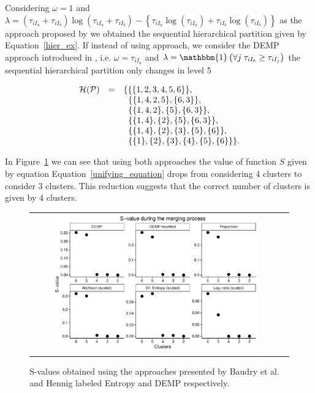 \documentclass[10pt, a4paper]{article}
\begin{document}
\begin{spacing}{1.9}
Considering $\omega = 1$ and $\lambda = (\tau_{iI_a}+\tau_{iI_b}) \log(\tau_{iI_a} + \tau_{iI_b}) - \left\{ \tau_{iI_a} \log(\tau_{iI_a}) + \tau_{iI_b} \log(\tau_{iI_b}) \right\}$ as the approach proposed by \cite{baudry2010combining} we obtained the sequential hierarchical partition given by Equation~\ref{hier_ex}. If instead of using \cite{baudry2010combining}  approach, we consider  the DEMP approach introduced in \citep{hennig2010methods}, i.e. $\omega = \tau_{i I_a}$ and $\lambda = \mathbbm{1}\left( \forall j\; \tau_{i I_{b}} \geq \tau_{iI_j} \right)$ the sequential hierarchical partition only changes in level 5

\begin{equation}
\begin{array}{r c l}
\mathcal{H}(\mathcal{P}) &=& \{ \{\{1, 2, 3, 4, 5, 6\}\}, \\
   & & \;\; \{ \{1, 4, 2, 5\}, \{6, 3\} \},  \\
    & & \;\; \{ \{1, 4, 2\}, \{5\}, \{6, 3\} \}, \\
   & & \;\; \{ \{1, 4\},\{2\}, \{5\}, \{6, 3\} \}, \\
   & & \;\;  \{\{1, 4\},\{2\}, \{3\},\{5\},\{6\} \},\\
   & &  \;\;  \{\{1\},\{2\},\{3\},\{4\},\{5\},\{6\}\} \}.
\end{array}
\end{equation}

In Figure~\ref{gaussian_Svalues} we can see that using both approaches the value of function $S$ given by equation Equation~\ref{unifying_equation} drops from considering 4 clusters to consider 3 clusters. This reduction suggests that the correct number of clusters is given by 4 clusters.

\begin{figure}[t]
\begin{center}
\begin{tabular}{cc}
  \includegraphics[width=0.85\textwidth]{figures/gaussian_Svalues.pdf} \\
 \end{tabular}
 \caption{S-values obtained using the approaches presented by Baudry et al. and Hennig labeled Entropy and DEMP respectively.}\label{gaussian_Svalues}
\end{center}
\end{figure}


\end{spacing}
\end{document}
